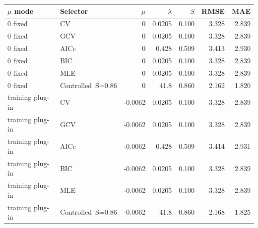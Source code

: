 \begin{tabular}{llrrrrr}
\toprule
$\mu$ mode & Selector & $\mu$ & $\lambda$ & $S$ & RMSE & MAE \\
\midrule
$0$ fixed & CV & 0 & 0.0205 & 0.100 & 3.328 & 2.839 \\
$0$ fixed & GCV & 0 & 0.0205 & 0.100 & 3.328 & 2.839 \\
$0$ fixed & AICc & 0 & 0.428 & 0.509 & 3.413 & 2.930 \\
$0$ fixed & BIC & 0 & 0.0205 & 0.100 & 3.328 & 2.839 \\
$0$ fixed & MLE & 0 & 0.0205 & 0.100 & 3.328 & 2.839 \\
$0$ fixed & Controlled~S=0.86 & 0 & 41.8 & 0.860 & 2.162 & 1.820 \\
training plug-in & CV & -0.0062 & 0.0205 & 0.100 & 3.328 & 2.839 \\
training plug-in & GCV & -0.0062 & 0.0205 & 0.100 & 3.328 & 2.839 \\
training plug-in & AICc & -0.0062 & 0.428 & 0.509 & 3.414 & 2.931 \\
training plug-in & BIC & -0.0062 & 0.0205 & 0.100 & 3.328 & 2.839 \\
training plug-in & MLE & -0.0062 & 0.0205 & 0.100 & 3.328 & 2.839 \\
training plug-in & Controlled~S=0.86 & -0.0062 & 41.8 & 0.860 & 2.168 & 1.825 \\
\bottomrule
\end{tabular}
